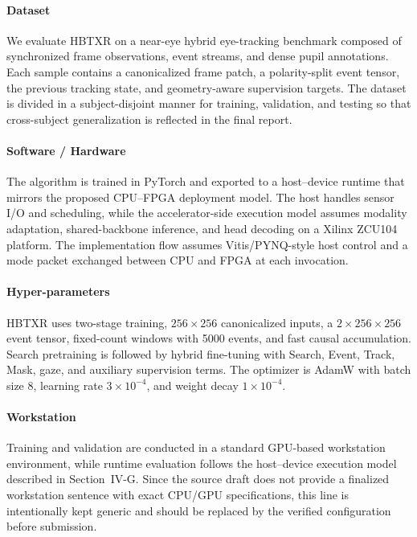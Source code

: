\documentclass[journal]{IEEEtran}
\begin{document}
\paragraph*{Dataset}
We evaluate HBTXR on a near-eye hybrid eye-tracking benchmark composed of synchronized frame observations, event streams, and dense pupil annotations. Each sample contains a canonicalized frame patch, a polarity-split event tensor, the previous tracking state, and geometry-aware supervision targets. The dataset is divided in a subject-disjoint manner for training, validation, and testing so that cross-subject generalization is reflected in the final report.

\paragraph*{Software / Hardware}
The algorithm is trained in PyTorch and exported to a host--device runtime that mirrors the proposed CPU--FPGA deployment model. The host handles sensor I/O and scheduling, while the accelerator-side execution model assumes modality adaptation, shared-backbone inference, and head decoding on a Xilinx ZCU104 platform. The implementation flow assumes Vitis/PYNQ-style host control and a mode packet exchanged between CPU and FPGA at each invocation.

\paragraph*{Hyper-parameters}
HBTXR uses two-stage training, $256\times256$ canonicalized inputs, a $2\times256\times256$ event tensor, fixed-count windows with 5000 events, and fast causal accumulation. Search pretraining is followed by hybrid fine-tuning with Search, Event, Track, Mask, gaze, and auxiliary supervision terms. The optimizer is AdamW with batch size 8, learning rate $3\times10^{-4}$, and weight decay $1\times10^{-4}$.

\paragraph*{Workstation}
Training and validation are conducted in a standard GPU-based workstation environment, while runtime evaluation follows the host--device execution model described in Section~IV-G. Since the source draft does not provide a finalized workstation sentence with exact CPU/GPU specifications, this line is intentionally kept generic and should be replaced by the verified configuration before submission.
\end{document}
